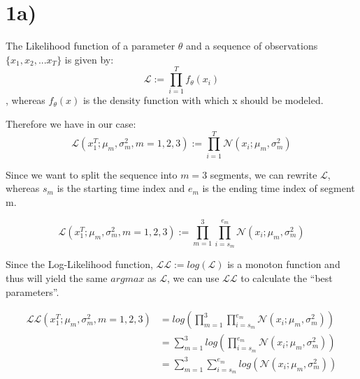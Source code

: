 \section*{1a)} %
\label{sec:1a}

The Likelihood function of a parameter $\theta$ and a sequence of observations $\{x_1,x_2,...x_T\}$ is given by:
\[
	\mathcal{L} := \prod_{i=1}^{T}f_{\theta}(x_i)
\], whereas $f_{\theta}(x)$ is the density function with which x should be modeled.

Therefore we have in our case:
\[
	\mathcal{L}(x_1^T; \mu_m, \sigma_m^2, m = 1,2,3) := \prod_{i=1}^{T}\mathcal{N}(x_i; \mu_m, \sigma_m^2)
\]

Since we want to split the sequence into $m=3$ segments, we can rewrite $\mathcal{L}$, whereas $s_m$ is the starting time index and $e_m$ is the ending time index of segment m.

\[
	\mathcal{L}(x_1^T; \mu_m, \sigma_m^2, m = 1,2,3) := \prod_{m=1}^{3}\prod_{i=s_m}^{e_m}\mathcal{N}(x_i; \mu_m, \sigma_m^2)
\]

Since the Log-Likelihood function, $\mathcal{L}\mathcal{L}:= log(\mathcal{L})$ is a monoton function and thus will yield the same $arg max$ as $\mathcal{L}$, we 
can use $\mathcal{L}\mathcal{L}$ to calculate the ``best parameters''.

\begin{align}
	\mathcal{L}\mathcal{L}(x_1^T; \mu_m, \sigma_m^2, m = 1,2,3) &= log(\prod_{m=1}^{3}\prod_{i=s_m}^{e_m}\mathcal{N}(x_i; \mu_m, \sigma_m^2)) \\
	&= \sum_{m=1}^{3}log(\prod_{i=s_m}^{e_m}\mathcal{N}(x_i; \mu_m, \sigma_m^2))\\
	&= \sum_{m=1}^{3}\sum_{i=s_m}^{e_m}log(\mathcal{N}(x_i; \mu_m, \sigma_m^2))
\end{align}


